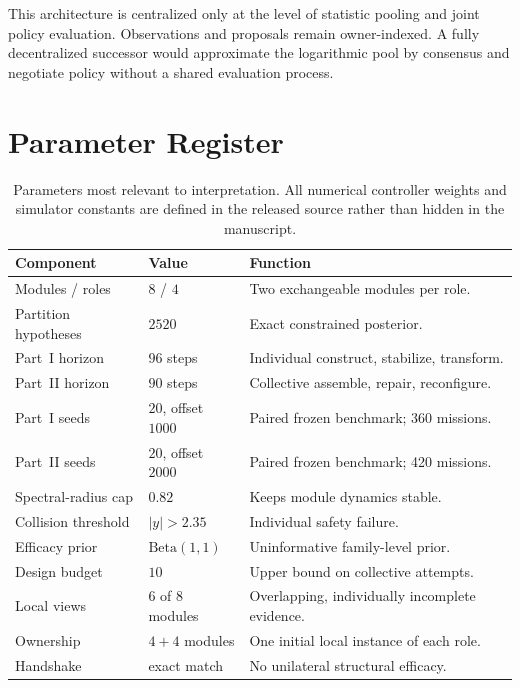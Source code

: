 \documentclass[11pt,a4paper]{article}
\numberwithin{equation}{section}
\begin{document}
This architecture is centralized only at the level of statistic pooling and
joint policy evaluation. Observations and proposals remain owner-indexed. A
fully decentralized successor would approximate the logarithmic pool by
consensus and negotiate policy without a shared evaluation process.

\section{Parameter Register}

\begin{table}[h]
\centering
\small
\begin{tabularx}{\textwidth}{l l X}
\toprule
Component & Value & Function \\
\midrule
Modules / roles & $8$ / $4$ & Two exchangeable modules per role. \\
Partition hypotheses & $2520$ & Exact constrained posterior. \\
Part~I horizon & $96$ steps & Individual construct, stabilize, transform. \\
Part~II horizon & $90$ steps & Collective assemble, repair, reconfigure. \\
Part~I seeds & $20$, offset $1000$ & Paired frozen benchmark; 360 missions. \\
Part~II seeds & $20$, offset $2000$ & Paired frozen benchmark; 420 missions. \\
Spectral-radius cap & $0.82$ & Keeps module dynamics stable. \\
Collision threshold & $|y|>2.35$ & Individual safety failure. \\
Efficacy prior & $\mathrm{Beta}(1,1)$ & Uninformative family-level prior. \\
Design budget & $10$ & Upper bound on collective attempts. \\
Local views & $6$ of $8$ modules & Overlapping, individually incomplete evidence. \\
Ownership & $4+4$ modules & One initial local instance of each role. \\
Handshake & exact match & No unilateral structural efficacy. \\
\bottomrule
\end{tabularx}
\caption{Parameters most relevant to interpretation. All numerical controller
weights and simulator constants are defined in the released source rather
than hidden in the manuscript.}
\label{tab:parameters}
\end{table}
\end{document}
